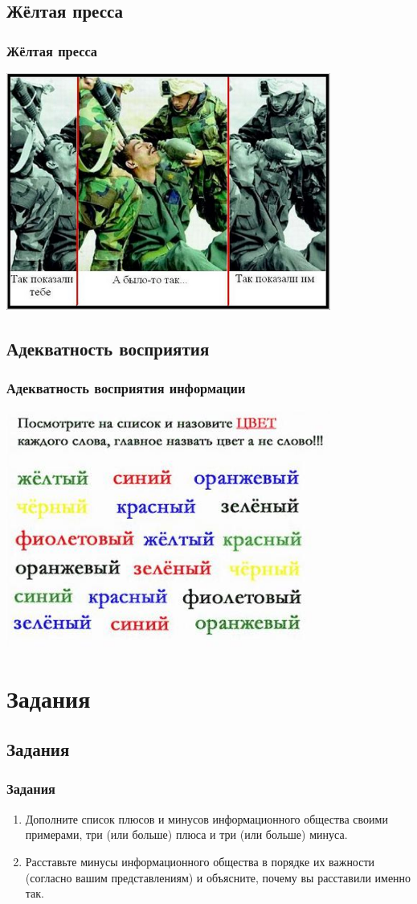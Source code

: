 \documentclass[compress,red]{beamer}
\begin{document}
\subsection{Жёлтая пресса}
\begin{frame}[fragile]
  \frametitle{Жёлтая пресса}
  \centerline{\includegraphics[width=0.8\textwidth]{images/news.png}}
\end{frame}

\subsection{Адекватность восприятия}
\begin{frame}[fragile]
  \frametitle{Адекватность восприятия информации}
  \centerline{\includegraphics[width=0.8\textwidth]{images/contest.png}}
\end{frame}

\section{Задания}
\subsection{Задания}
\begin{frame}[fragile]
  \frametitle{Задания}
  \begin{enumerate}
    \item Дополните список плюсов и минусов информационного общества своими примерами, три (или больше) плюса и три (или больше) минуса.
    \item Расставьте минусы информационного общества в порядке их важности (согласно вашим представлениям) и объясните, почему вы расставили именно так.
  \end{enumerate}
\end{frame}
\end{document}
